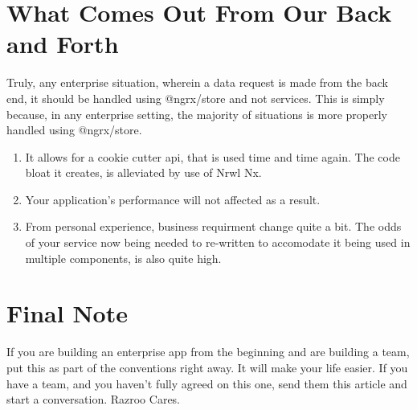 \section{ What Comes Out From Our Back and Forth }
Truly, any enterprise situation, wherein a data request is made from the
back end, it should be handled using @ngrx/store and not services. This is
simply because, in any enterprise setting, the majority of situations is more
properly handled using @ngrx/store.
\begin{enumerate}
  \item It allows for a cookie cutter api, that is used time and time again. The
  code bloat it creates, is alleviated by use of Nrwl Nx.
  \item Your application's performance will not affected as a result.
  \item From personal experience, business requirment change quite a bit. The
odds of your service now being needed to re-written to accomodate it being
used in multiple components, is also quite high.
\end{enumerate}

\section{ Final Note }
If you are building an enterprise app from the beginning and are building a
team, put this as part of the conventions right away. It will make your life
easier. If you have a team, and you haven't fully agreed on this one, send them
this article and start a conversation. Razroo Cares.
